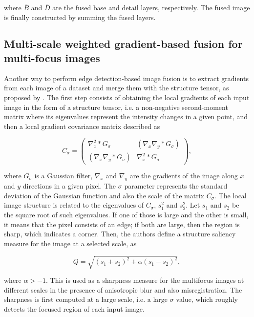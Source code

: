 \noindent where $\bar{B}$ and $\bar{D}$ are the fused base and detail layers, respectively. The fused image is finally constructed by summing the fused layers.

\subsection{Multi-scale weighted gradient-based fusion for multi-focus images}

Another way to perform edge detection-based image fusion is to extract gradients from each image of a dataset and merge them with the structure tensor, as proposed by . The first step consists of obtaining the local gradients of each input image in the form of a structure tensor, i.e. a non-negative second-moment matrix where its eigenvalues represent the intensity changes in a given point, and then a local gradient covariance matrix described as

\begin{equation}
C_{\sigma} =
    \begin{pmatrix}
        \nabla_{x}^{2} \ast G_{\sigma}
        &
        \left(
            \nabla_{x}\nabla_{y} \ast G_{\sigma}
        \right)
        \\
        \left(
            \nabla_{x}\nabla_{y} \ast G_{\sigma}
        \right)
        &
        \nabla_{x}^{2} \ast G_{\sigma}
    \end{pmatrix},
\end{equation}

\noindent where $G_{\sigma}$ is a Gaussian filter, $\nabla_{x}$ and $\nabla_{y}$ are the gradients of the image along $x$ and $y$ directions in a given pixel. The $\sigma$ parameter represents the standard deviation of the Gaussian function and also the scale of the matrix $C_{\sigma}$. The local image structure is related to the eigenvalues of $C_{\sigma}$, $s_{1}^{2}$ and $s_{2}^{2}$. Let $s_{1}$ and $s_{2}$ be the square root of such eigenvalues. If one of those is large and the other is small, it means that the pixel consists of an edge; if both are large, then the region is sharp, which indicates a corner. Then, the authors define a structure saliency measure for the image at a selected scale, as

\begin{equation}
\label{eqn:structure_saliency}
Q = \sqrt{(s_{1} + s_{2})^{2} + \alpha(s_{1} - s_{2})^{2}},
\end{equation}

\noindent where $\alpha > -1$. This is used as a sharpness measure for the multifocus images at different scales in the presence of anisotropic blur and also misregistration. The sharpness is first computed at a large scale, i.e. a large $\sigma$ value, which roughly detects the focused region of each input image.

